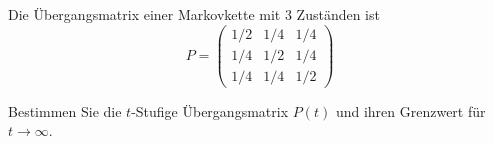 \begin{Exercise}[label=ex:4.5]
Die Übergangsmatrix einer Markovkette mit 3 Zuständen ist
\[P=\left(\begin{array}{ccc}
1/2 & 1/4 & 1/4\\
1/4 & 1/2 & 1/4\\
1/4 & 1/4 & 1/2
\end{array}\right)\]

Bestimmen Sie die $t$-Stufige Übergangsmatrix $P(t)$ und ihren Grenzwert für $t\rightarrow\infty$.
\end{Exercise}
\begin{Answer}
\end{Answer}

